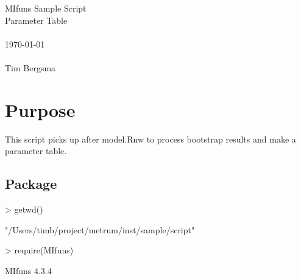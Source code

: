 
\usepackage{Sweave}

 

\vspace*{2cm}
\begin{center}
{\Large MIfuns Sample Script}\\
\vspace{1.5cm}
{\Large Parameter Table}\\
~\\
\today\\
~\\
Tim Bergsma\\
\end{center}
\newpage

\section{Purpose}
This script picks up after model.Rnw to process bootstrap results and make a parameter table.
\subsection{Package}
\begin{Schunk}
\begin{Sinput}
> getwd()
\end{Sinput}
\begin{Soutput}
[1] "/Users/timb/project/metrum/inst/sample/script"
\end{Soutput}
\begin{Sinput}
> require(MIfuns)
\end{Sinput}
\begin{Soutput}
MIfuns 4.3.4 
\end{Soutput}
\end{Schunk}
